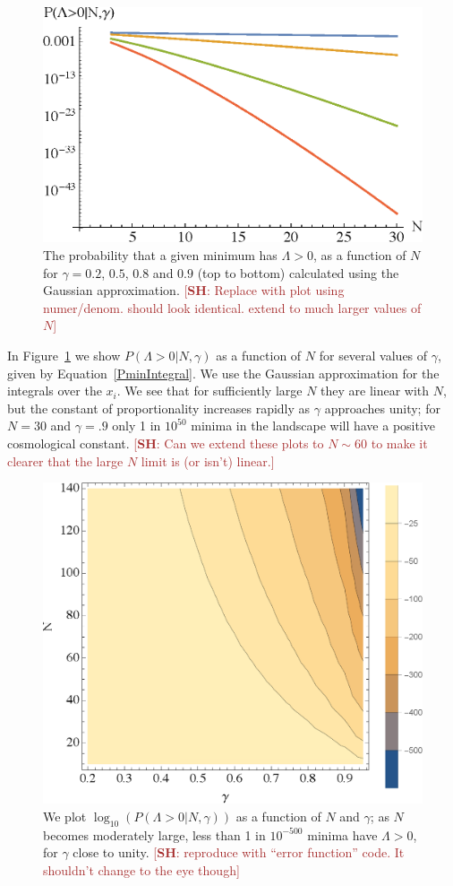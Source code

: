 \documentclass[12pt]{article}
\newcommand{\SH}[1]{\textcolor{brown}{[{\bf SH}: #1]}}
\begin{document}
\begin{figure} 
  \centering
  \includegraphics[width=.6 \linewidth]{pwithN.eps}
  \caption{The probability that a given minimum has $\Lambda>0$, as a function of $N$ for $\gamma=0.2$, $0.5$, $0.8$ and $0.9$ (top to bottom) calculated using the Gaussian approximation. \SH{Replace with plot using numer/denom. should look identical. extend to much larger values of $N$}}
  \label{PVaryingWithNGaussian}
\end{figure}
  
In  Figure~\ref{PVaryingWithNGaussian} we show $P(\Lambda>0|N,\gamma)$ as a function of $N$ for several values of $\gamma$, given by Equation~\ref{PminIntegral}. We use the Gaussian approximation for the integrals over the $x_i$. We see that for sufficiently large $N$ they are linear with $N$, but the constant of proportionality increases rapidly as $\gamma$ approaches unity; for $N=30$ and $\gamma = .9$ only 1 in $10^{50}$ minima in the landscape will have a positive cosmological constant. \SH{Can we extend these plots to $N\sim 60$ to make it clearer that the large $N$ limit is (or isn't) linear.}


\begin{figure} 
  \centering
  \includegraphics[width=.6 \linewidth]{histo.eps}
  \caption{We plot $\log_{10}(P(\Lambda>0|N,\gamma))$ as a function of $N$ and $\gamma$; as $N$ becomes moderately large, less than 1 in $10^{-500}$ minima have $\Lambda>0$, for $\gamma$  close to unity.  \SH{reproduce with ``error function'' code. It shouldn't change to the eye though}}
  \label{fullcontourplot}
\end{figure}
\end{document}
